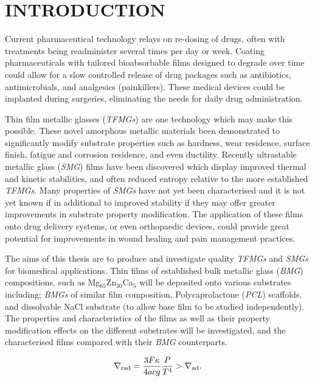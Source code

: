 \section{INTRODUCTION }

Current pharmaceutical technology relays on re-dosing of drugs, often with treatments being readminister several times per day or week. Coating pharmaceuticals with tailored bioabsorbable films designed to degrade over time could allow for a slow controlled release of drug packages such as antibiotics, antimicrobials, and analgesics (painkillers). These medical devices could be implanted during surgeries, eliminating the needs for daily drug administration.  

Thin film metallic glasses (\textit{TFMGs}) are one technology which may make this possible. These novel amorphous metallic materials been demonstrated to significantly modify substrate properties such as hardness, wear residence, surface finish, fatigue and corrosion residence, and even ductility. Recently ultrastable metallic glass (\textit{SMG}) films have been discovered which display improved thermal and kinetic stabilities, and often reduced entropy relative to the more established \textit{TFMGs}. Many properties of \textit{SMGs} have not yet been characterised and it is not yet known if in additional to improved stability if they may offer greater improvements in substrate property modification. The application of these films onto drug delivery systems, or even orthopaedic devices, could provide great potential for improvements in wound healing and pain management practices.

The aims of this thesis are to produce and investigate quality \textit{TFMGs} and \textit{SMGs} for biomedical applications. Thin films of established bulk metallic glass (\textit{BMG}) compositions, such as Mg$_{65}$Zn$_{30}$Ca$_{5}$ will be deposited onto various substrates including; \textit{BMGs} of similar film composition, Polycaprolactone (\textit{PCL}) scaffolds, and dissolvable NaCl substrate (to allow base film to be studied independently). The properties and characteristics of the films as well as their property modification effects on the different substrates will be investigated, and the characterised films compared with their \textit{BMG} counterparts. 

\begin{equation}
\label{eqn:test-equation}
\nabla_{\rm rad} = \frac{3F\kappa}{4acg}\frac{P}{T^4} > \nabla_{\rm ad}.
\end{equation}
